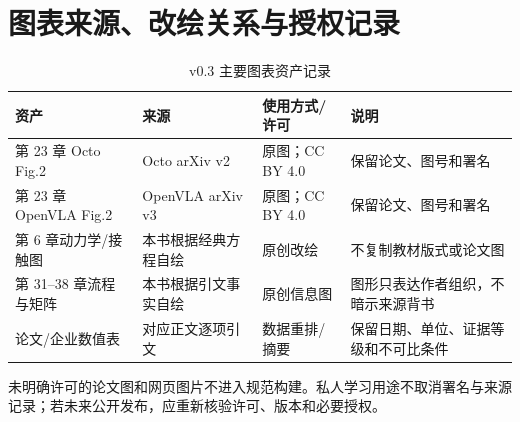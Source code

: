 \chapter{图表来源、改绘关系与授权记录}
\label{app:asset-rights}

\begin{table}[H]
\begingroup{}
\centering\small
\caption{v0.3 主要图表资产记录}
\label{tab:asset-rights-index}
\begin{tabularx}{\textwidth}{p{}p{}p{}Y}
\toprule
资产 & 来源 & 使用方式/许可 & 说明 \\
\midrule
第 23 章 Octo Fig.2 & Octo arXiv v2 & 原图；CC BY 4.0 & 保留论文、图号和署名 \\
第 23 章 OpenVLA Fig.2 & OpenVLA arXiv v3 & 原图；CC BY 4.0 & 保留论文、图号和署名 \\
第 6 章动力学/接触图 & 本书根据经典方程自绘 & 原创改绘 & 不复制教材版式或论文图 \\
第 31--38 章流程与矩阵 & 本书根据引文事实自绘 & 原创信息图 & 图形只表达作者组织，不暗示来源背书 \\
论文/企业数值表 & 对应正文逐项引文 & 数据重排/摘要 & 保留日期、单位、证据等级和不可比条件 \\
\bottomrule
\end{tabularx}
\endgroup
\end{table}

未明确许可的论文图和网页图片不进入规范构建。私人学习用途不取消署名与来源记录；若未来公开发布，应重新核验许可、版本和必要授权。

